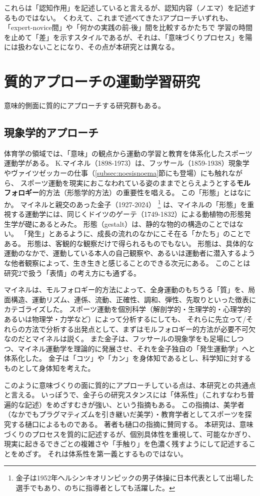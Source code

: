 これらは「認知作用」を記述していると言えるが、認知内容（ノエマ）を記述するものではない。
くわえて、これまで述べてきた3アプローチいずれも、「expert-novice間」や「何かの実践の前-後」間を比較するかたちで
学習の時間を止めて「差」を示すスタイルであるが、それは、「意味づくりプロセス」を陽には扱わないことになり、その点が本研究とは異なる。
\section{質的アプローチの運動学習研究}
意味的側面に質的にアプローチする研究群もある。
\subsection{現象学的アプローチ}
体育学の領域では、「意味」の観点から運動の学習と教育を体系化したスポーツ運動学がある。
K.マイネル（1898-1973）\cite{meinel:1960}は、フッサール（1859-1938）現象学やヴァイツゼッカーの仕事\cite{weizsaecker:1950}（\ref{subsec:noesisnoema}節にも登場）にも触れながら、
スポーツ運動を現実におこなわれている姿のままでとらえようとする\textbf{モルフォロギー}的方法（形態学的方法）の重要性を唱える。
この「形態」とはなにか。
マイネルと親交のあった金子（1927-2024）
\footnote{金子は1952年ヘルシンキオリンピックの男子体操に日本代表として出場した選手でもあり、のちに指導者としても活躍した。}
は、マイネルの「形態」を重視する運動学には、同じくドイツのゲーテ（1749-1832）による動植物の形態発生学が礎にあるとみた。
形態（gestalt）は、静的な物的の構造のことではない。
「発生」とあるように、成長の流れのなかにこそ在る「かたち」のことである。
形態は、客観的な観察だけで得られるものでもない。
形態は、具体的な運動のなかで、運動している本人の自己観察や、あるいは運動者に潜入するような他者観察によって、生き生きと感じることのできる次元にある。
このことは研究2で扱う「表情」の考え方にも通ずる。

マイネルは、モルフォロギー的方法によって、全身運動のもちうる「質」を、局面構造、運動リズム、連係、流動、正確性、調和、弾性、先取りといった徴表にカテゴライズした。
スポーツ運動を個別科学（解剖学的・生理学的・心理学的あるいは物理学・力学など）によって分析するにしても、
それらに先立って/それらの方法で分析する出発点として、まずはモルフォロギー的方法が必要不可欠なのだとマイネルは説く。
また金子は、フッサールの現象学をも足場にしつつ、マイネル運動学を理論的に発展させ、それを金子独自の「発生運動学」へと体系化した。
金子は「コツ」や「カン」を身体知であるとし、科学知に対するものとして身体知を考えた。

このように意味づくりの面に質的にアプローチしている点は、本研究との共通点と言える。
いっぽうで、金子らの研究スタンスには「体系性」（これすなわち普遍的な記述）をめざすむきが強い、という指摘もある。
この指摘は、美学者（なかでもプラグマティズムを引き継いだ美学）・教育学者としてスポーツを探究する樋口\cite{higuchi_et_al:2017}によるものである。
著者も樋口の指摘に賛同する。
本研究は、意味づくりのプロセスを質的に記述するが、個別具体性を重視して、可能なかぎり、現実に起きるできごとの複雑さや「手触り」を色濃く残すようにして記述することをめざす。
それは体系性を第一義とするものではない。
